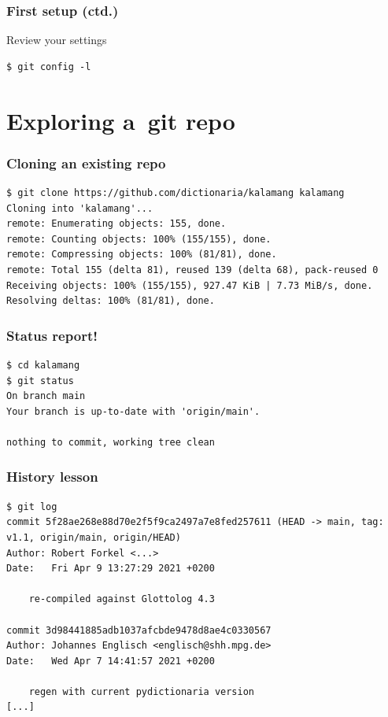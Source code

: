 \documentclass[12pt]{beamer}
\begin{document}
\begin{frame}[fragile]
  \frametitle{First setup (ctd.)}

  \begin{block}{Review your settings}
    {\footnotesize{}%
      \begin{verbatim}
$ git config -l
      \end{verbatim}%
    }
  \end{block}
\end{frame}

\section{Exploring a~git repo}

\begin{frame}[fragile]
  \frametitle{Cloning an existing repo}

  {\footnotesize{}%
    \begin{verbatim}
$ git clone https://github.com/dictionaria/kalamang kalamang
Cloning into 'kalamang'...
remote: Enumerating objects: 155, done.
remote: Counting objects: 100% (155/155), done.
remote: Compressing objects: 100% (81/81), done.
remote: Total 155 (delta 81), reused 139 (delta 68), pack-reused 0
Receiving objects: 100% (155/155), 927.47 KiB | 7.73 MiB/s, done.
Resolving deltas: 100% (81/81), done.
    \end{verbatim}%
  }
\end{frame}

\begin{frame}[fragile]
  \frametitle{Status report!}

  {\footnotesize{}%
    \begin{verbatim}
$ cd kalamang
$ git status
On branch main
Your branch is up-to-date with 'origin/main'.

nothing to commit, working tree clean
    \end{verbatim}%
  }
\end{frame}

\begin{frame}[fragile]
  \frametitle{History lesson}

  {\footnotesize{}%
    \begin{verbatim}
$ git log
commit 5f28ae268e88d70e2f5f9ca2497a7e8fed257611 (HEAD -> main, tag: v1.1, origin/main, origin/HEAD)
Author: Robert Forkel <...>
Date:   Fri Apr 9 13:27:29 2021 +0200

    re-compiled against Glottolog 4.3

commit 3d98441885adb1037afcbde9478d8ae4c0330567
Author: Johannes Englisch <englisch@shh.mpg.de>
Date:   Wed Apr 7 14:41:57 2021 +0200

    regen with current pydictionaria version
[...]
    \end{verbatim}%
  }
\end{frame}
\end{document}
